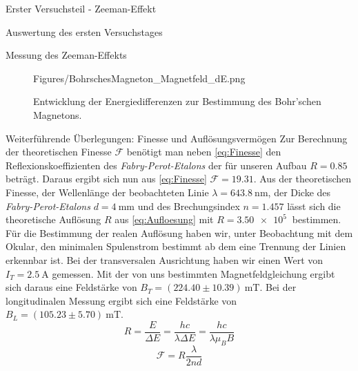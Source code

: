 \documentclass[pdftex, a4paper,11pt, twoside, ngerman]{report}
\begin{document}
\begin{chapter}{Erster Versuchsteil - Zeeman-Effekt}
\begin{section}{Auswertung des ersten Versuchstages}
\begin{subsection}{Messung des Zeeman-Effekts}
\begin{figure}[ht]
              {Figures/BohrschesMagneton_Magnetfeld_dE.png}
          \caption{Entwicklung der Energiedifferenzen zur Bestimmung des
              Bohr'schen Magnetons.}
          \label{fig:BohrschesMagneton}
        \end{figure}
        
      \end{subsection}
      
      
      
      \begin{subsection}
      {Weiterführende Überlegungen: Finesse und Auflösungsvermögen}
        \label{chp:Zeeman:sec:AuswertungWeiteres}
        Zur Berechnung der theoretischen Finesse $\mathcal{F}$ benötigt man
        neben \cref{eq:Finesse} den Reflexionskoeffizienten des 
        \textit{Fabry-Perot-Etalons} der für unseren Aufbau $R=0.85$ beträgt.
        Daraus ergibt sich nun aus \cref{eq:Finesse} $\mathcal{F}=19.31$.
        Aus der theoretischen Finesse, der Wellenlänge der beobachteten Linie
        $\lambda=\SI{643.8}{\nano\meter}$, der Dicke des
        \textit{Fabry-Perot-Etalons} $d=\SI{4}{\milli\meter}$ und des
        Brechungsindex $n=1.457$ lässt sich die theoretische Auflösung $R$ aus
        \cref{eq:Aufloesung} mit $R=\SI{3.50e5}{}$ bestimmen. \newline
        Für die Bestimmung der realen Auflösung haben wir, unter Beobachtung
        mit dem Okular, den minimalen Spulenstrom bestimmt ab dem eine Trennung
        der Linien erkennbar ist. Bei der transversalen Ausrichtung haben wir
        einen Wert von $I_T=\SI{2.5}{\ampere}$ gemessen. Mit der von uns
        bestimmten Magnetfeldgleichung ergibt sich daraus eine Feldstärke von
        $B_T=(224.40\pm 10.39)\SI{}{\milli\tesla}$. Bei der longitudinalen
        Messung ergibt sich eine Feldstärke von 
        $B_L=(105.23\pm 5.70)\SI{}{\milli\tesla}$. 
        \begin{equation}
          \label{eq:AufloesungReal}
          R=\frac{E}{\Delta E}=\frac{hc}{\lambda\Delta E} = 
          \frac{hc}{\lambda\mu_{B}B}
        \end{equation}
        \begin{equation}
          \label{eq:FinesseReal}
          \mathcal{F}=R\frac{\lambda}{2nd}
        \end{equation}
        \newline

\end{subsection}
\end{section}
\end{chapter}
\end{document}
